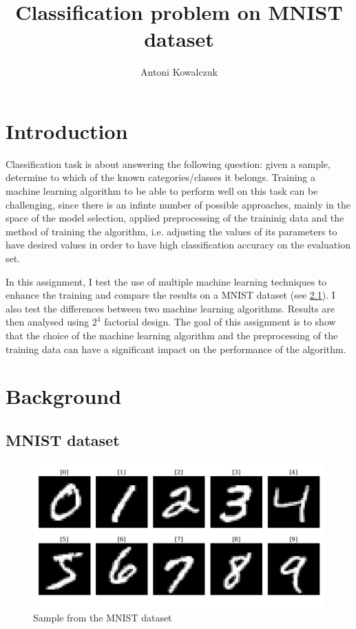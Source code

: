 \documentclass{article}
\title{Classification problem on MNIST dataset}
\author{
  Antoni Kowalczuk
}
\begin{document}
\maketitle

\section{Introduction}
Classification task is about answering the following question: given a sample, determine to which of the known categories/classes it belongs. Training a machine learning algorithm to be able to perform well on this task can be challenging, since there is an infinte number of possible approaches, mainly in the space of the model selection, applied preprocessing of the traininig data and the method of training the algorithm, i.e. adjusting the values of its parameters to have desired values in order to have high classification accuracy on the evaluation set.

In this assignment, I test the use of multiple machine learning techniques to enhance the training and compare the results on a MNIST dataset (see \ref{subsec:mnist}). I also test the differences between two machine learning algorithms. Results are then analysed using $2^4$ factorial design. The goal of this assignment is to show that the choice of the machine learning algorithm and the preprocessing of the training data can have a significant impact on the performance of the algorithm.

\section{Background}

\subsection{MNIST dataset}
\label{subsec:mnist}

\begin{figure}[ht]
    \centering
    \includegraphics[width=\textwidth]{mnist.png}
    \caption{Sample from the MNIST dataset}
    \label{fig:mnist_sample}
\end{figure}
\end{document}

